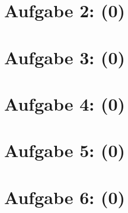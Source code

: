 \documentclass{scrartcl}
\begin{document}
\section*{Aufgabe 2:  (0)}

\clearpage
\pagebreak

\section*{Aufgabe 3:  (0)}

\clearpage
\pagebreak

\section*{Aufgabe 4:  (0)}

\clearpage
\pagebreak

\section*{Aufgabe 5:  (0)}

\clearpage
\pagebreak

\section*{Aufgabe 6:  (0)}
\end{document}
